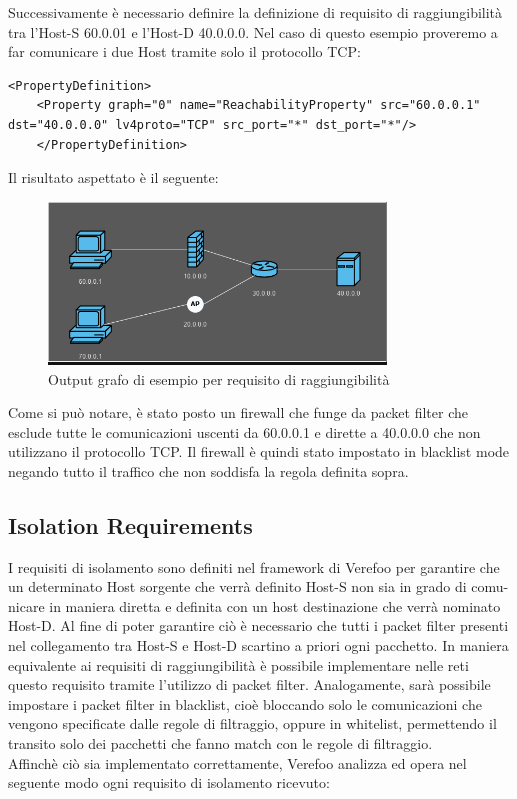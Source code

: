 Successivamente è necessario definire la definizione di requisito di raggiungibilità tra l'Host-S 60.0.01 e l'Host-D 40.0.0.0. Nel caso di questo esempio
proveremo a far comunicare i due Host tramite solo il protocollo TCP:
\begin{lstlisting}[style=mystyle,caption={Esempio di requisito di raggiungibilità}]
    <PropertyDefinition>
    <Property graph="0" name="ReachabilityProperty" src="60.0.0.1" dst="40.0.0.0" lv4proto="TCP" src_port="*" dst_port="*"/>
    </PropertyDefinition>
    \end{lstlisting}
    \newpage
Il risultato aspettato è il seguente:\\
\begin{figure}[h]  %
    \centering
    \includegraphics[width=0.8\textwidth]{Reachability_risolta.png}  %
    \caption{Output grafo di esempio per requisito di raggiungibilità}
    \label{fig:Reachability_Soddisfatta}
  \end{figure}


Come si può notare, è stato posto un firewall che funge da packet filter che esclude tutte le comunicazioni uscenti da 60.0.0.1 e dirette a 40.0.0.0 che non utilizzano
il protocollo TCP. Il firewall è quindi stato impostato in blacklist mode negando tutto il traffico che non soddisfa la regola definita sopra.





\subsection{Isolation Requirements}

I requisiti di isolamento sono definiti nel framework di Verefoo per garantire
che un determinato Host sorgente che verrà definito Host-S non sia in grado di comu-
nicare in maniera diretta e definita con un host destinazione che verrà nominato
Host-D. Al fine di poter garantire ciò è necessario che tutti i packet filter presenti nel collegamento tra
Host-S e Host-D scartino a priori ogni pacchetto. In maniera equivalente ai requisiti di raggiungibilità è possibile
implementare nelle reti questo requisito tramite l'utilizzo di packet filter. Analogamente, sarà possibile impostare i
packet filter in blacklist, cioè bloccando solo le comunicazioni che vengono specificate dalle regole di filtraggio, oppure in 
whitelist, permettendo il transito solo dei pacchetti che fanno match con le regole di filtraggio.\\
Affinchè ciò sia implementato correttamente, Verefoo analizza ed opera nel seguente modo\cite{cit2} ogni requisito di isolamento ricevuto:

